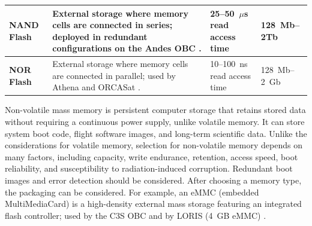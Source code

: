 \documentclass[10pt]{../datasheet}
\let\cite\citep
\begin{document}
\begin{longtable}{|p{2.8cm}|p{8.8cm}|p{2.1cm}|p{2.1cm}|}
  \textbf{NAND Flash}                                                                                                                                                                                                                                                                                                                          &
  External storage where memory cells are connected in series; deployed in redundant configurations on the Andes OBC \cite[p.~232]{nasa_soa_2024} \cite[p.~230]{nasa_soa_2026}.                                                                                                                                                                &
  25--50~$\mu$s read access time \cite{aichiplink_nand_nor_2026}
                                                                                                                                                                                                                                                                                                                                               &
  128~Mb--2Tb \cite{micron_nor_nand}
  \\ \hline

  \textbf{NOR Flash}                                                                                                                                                                                                                                                                                                                           &
  External storage where memory cells are connected in parallel; used by Athena \cite{athena_obc_site} and ORCASat \cite{orcasat_obc_site}.                                                                                                                                                                                                    &
  10--100~ns read access time \cite{aichiplink_nand_nor_2026}                                                                                                                                                                                                                                                                                  &
  128~Mb--2~Gb \cite{micron_nor_nand}
  \\ \hline
\end{longtable}

Non-volatile mass memory is persistent computer storage that retains stored data without requiring a continuous power supply, unlike volatile memory. It can store system boot code, flight software images, and long-term scientific data. Unlike the considerations for volatile memory, selection for non-volatile memory depends on many factors, including capacity, write endurance, retention, access speed, boot reliability, and susceptibility to radiation-induced corruption. Redundant boot images and error detection should be considered. After choosing a memory type, the packaging can be considered. For example, an eMMC (embedded MultiMediaCard) is a high-density external mass storage featuring an integrated flash controller; used by the C3S OBC \cite[p.~229]{nasa_soa_2023} and by LORIS (4~GB eMMC) \cite{loris_obc_pub}.
\end{document}
